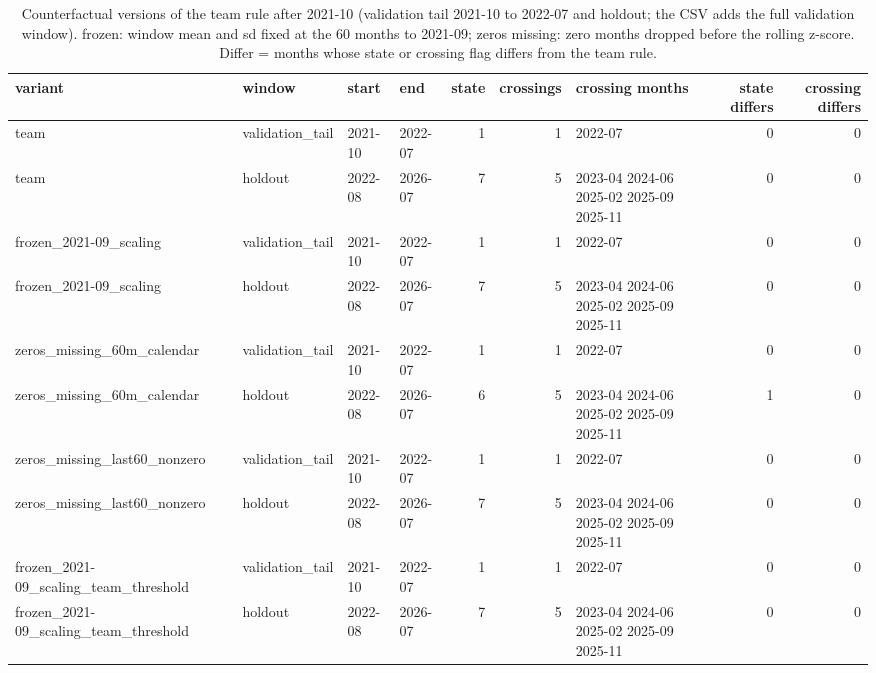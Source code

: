\begin{table}
\caption{Counterfactual versions of the team rule after 2021-10 (validation tail 2021-10 to 2022-07 and holdout; the CSV adds the full validation window). frozen: window mean and sd fixed at the 60 months to 2021-09; zeros missing: zero months dropped before the rolling z-score. Differ = months whose state or crossing flag differs from the team rule.}
\label{tab:m1_zero_cf}
\begin{tabular}{llllrrlrr}
\toprule
variant & window & start & end & state & crossings & crossing months & state differs & crossing differs \\
\midrule
team & validation\_tail & 2021-10 & 2022-07 & 1 & 1 & 2022-07 & 0 & 0 \\
team & holdout & 2022-08 & 2026-07 & 7 & 5 & 2023-04 2024-06 2025-02 2025-09 2025-11 & 0 & 0 \\
frozen\_2021-09\_scaling & validation\_tail & 2021-10 & 2022-07 & 1 & 1 & 2022-07 & 0 & 0 \\
frozen\_2021-09\_scaling & holdout & 2022-08 & 2026-07 & 7 & 5 & 2023-04 2024-06 2025-02 2025-09 2025-11 & 0 & 0 \\
zeros\_missing\_60m\_calendar & validation\_tail & 2021-10 & 2022-07 & 1 & 1 & 2022-07 & 0 & 0 \\
zeros\_missing\_60m\_calendar & holdout & 2022-08 & 2026-07 & 6 & 5 & 2023-04 2024-06 2025-02 2025-09 2025-11 & 1 & 0 \\
zeros\_missing\_last60\_nonzero & validation\_tail & 2021-10 & 2022-07 & 1 & 1 & 2022-07 & 0 & 0 \\
zeros\_missing\_last60\_nonzero & holdout & 2022-08 & 2026-07 & 7 & 5 & 2023-04 2024-06 2025-02 2025-09 2025-11 & 0 & 0 \\
frozen\_2021-09\_scaling\_team\_threshold & validation\_tail & 2021-10 & 2022-07 & 1 & 1 & 2022-07 & 0 & 0 \\
frozen\_2021-09\_scaling\_team\_threshold & holdout & 2022-08 & 2026-07 & 7 & 5 & 2023-04 2024-06 2025-02 2025-09 2025-11 & 0 & 0 \\
\bottomrule
\end{tabular}
\end{table}
